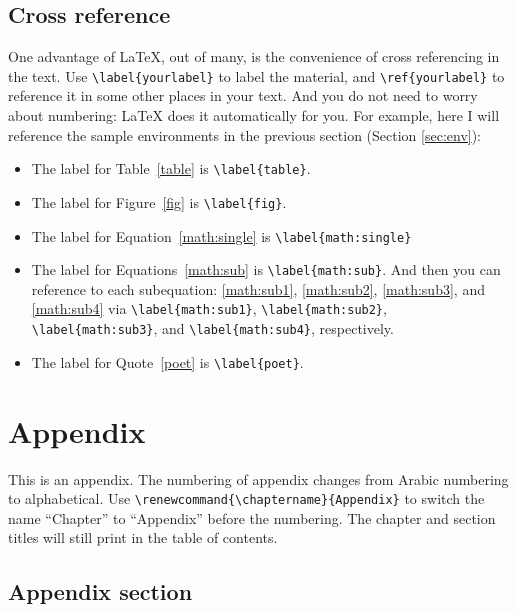 \documentclass[final]{emory}
\begin{document}
\section{Cross reference}
One advantage of \LaTeX{}, out of many, is the convenience of cross referencing in
the text. Use \Verb|\label{yourlabel}| to label the material, and \Verb|\ref{yourlabel}|
to reference it in some other places in your text. And you do not need to worry
about numbering: \LaTeX{} does it automatically for you. For example, here
I will reference the sample environments in the previous section (Section 
\ref{sec:env}):
\begin{itemize}
\item The label for Table~\ref{table} is \Verb|\label{table}|.
\item The label for Figure~\ref{fig} is \Verb|\label{fig}|.
\item The label for Equation~\ref{math:single} is \Verb|\label{math:single}|
\item The label for Equations~\ref{math:sub} is \Verb|\label{math:sub}|. And then
      you can reference to each subequation: \ref{math:sub1}, \ref{math:sub2}, 
      \ref{math:sub3}, and \ref{math:sub4} via \Verb|\label{math:sub1}|,
      \Verb|\label{math:sub2}|, \Verb|\label{math:sub3}|, and \Verb|\label{math:sub4}|,
      respectively.
\item The label for Quote~\ref{poet} is \Verb|\label{poet}|.
\end{itemize}


\appendix
\renewcommand{\chaptername}{Appendix}

\chapter{Appendix}
This is an appendix. The numbering of appendix changes from Arabic numbering to 
alphabetical. Use \Verb|\renewcommand{\chaptername}{Appendix}| to switch
the name ``Chapter'' to ``Appendix'' before the numbering.
The chapter and section titles will still print in the table of contents.

\section{Appendix section}
\end{document}
